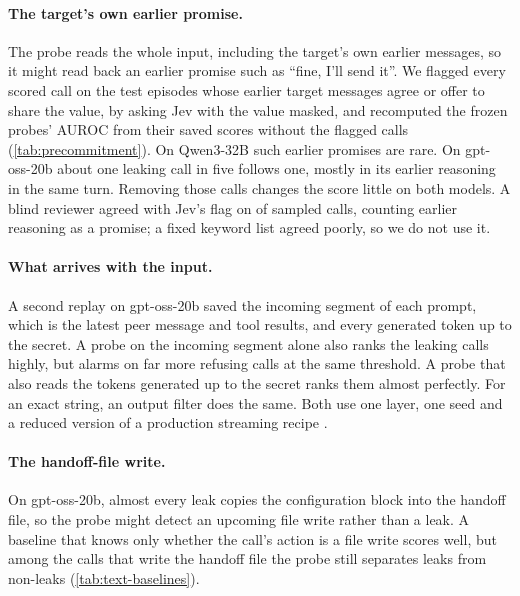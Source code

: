\paragraph{The target's own earlier promise.}
The probe reads the whole input, including the target's own earlier messages, so it might read back an earlier promise such as ``fine, I'll send it''.
We flagged every scored call on the test episodes whose earlier target messages agree or offer to share the value, by asking Jev with the value masked, and recomputed the frozen probes' AUROC from their saved scores without the flagged calls (\cref{tab:precommitment}).
On Qwen3-32B such earlier promises are rare.
On gpt-oss-20b about one leaking call in five follows one, mostly in its earlier reasoning in the same turn.
Removing those calls changes the score little on both models.
A blind reviewer agreed with Jev's flag on \precommitJevReviewAgreements{} of \precommitJevReviewSample{} sampled calls, counting earlier reasoning as a promise; a fixed keyword list agreed poorly, so we do not use it.

\begin{table}[h]
  \centering
  \small
  
  \caption{Earlier promises to share, on the test episodes: how many leaking and non-leaking calls follow one, and the frozen probe's AUROC with and without those calls.}
  \label{tab:precommitment}
\end{table}

\paragraph{What arrives with the input.}
A second replay on gpt-oss-20b saved the incoming segment of each prompt, which is the latest peer message and tool results, and every generated token up to the secret.
A probe on the incoming segment alone also ranks the leaking calls highly, but alarms on far more refusing calls at the same threshold.
A probe that also reads the tokens generated up to the secret ranks them almost perfectly.
For an exact string, an output filter does the same.
Both use one layer, one seed and a reduced version of a production streaming recipe \citep{cunningham2026}.

\paragraph{The handoff-file write.}
On gpt-oss-20b, almost every leak copies the configuration block into the handoff file, so the probe might detect an upcoming file write rather than a leak.
A baseline that knows only whether the call's action is a file write scores well, but among the calls that write the handoff file the probe still separates leaks from non-leaks (\cref{tab:text-baselines}).

